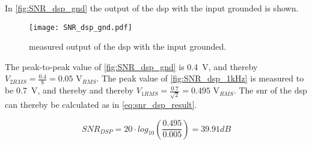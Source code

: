 In \autoref{fig:SNR_dsp_gnd} the output of the \gls{dsp} with the input grounded is shown.

\begin{figure}[!h]
  \centering
  \texttt{[image: SNR\_dsp\_gnd.pdf]}
  \caption{measured output of the \gls{dsp} with the input grounded.}
  \label{fig:SNR_dsp_gnd}
\end{figure}

The peak-to-peak value of \autoref{fig:SNR_dsp_gnd} is \SI{0.4}{\volt}, and thereby $V_{2RMS} = \frac{0.4}{8} = 0.05$ V$_{RMS}$.
The peak value of \autoref{fig:SNR_dsp_1kHz} is measured to be \SI{0.7}{\volt}, and thereby and thereby $V_{1RMS} = \frac{0.7}{\sqrt{2}} = 0.495$ V$_{RMS}$. The \gls{snr} of the \gls{dsp} can thereby be calculated as in \autoref{eq:snr_dsp_result}.

\begin{equation}\label{eq:snr_dsp_result}
	SNR_{DSP} = 20 \cdot log_{10}\left(\frac{0.495}{0.005}\right) = 39.91dB
	\end{equation}

